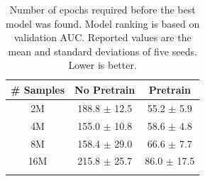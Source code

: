 \begin{table}[]
\centering
    \begin{tabular}{c|c|c}
    \hhline{===}
    \# Samples & No Pretrain & Pretrain \\ \hline
    2M  & 188.8 $\pm$ 12.5 & 55.2 $\pm$ 5.9 \\
    4M  & 155.0 $\pm$ 10.8 & 58.6 $\pm$ 4.8 \\
    8M  & 158.4 $\pm$ 29.0 & 66.6 $\pm$ 7.7 \\
    16M & 215.8 $\pm$ 25.7 & 86.0 $\pm$ 17.5 \\
    \hhline{===}
    \end{tabular}
    \caption{Number of epochs required before the best model was found. Model ranking is based on validation AUC. Reported values are the mean and standard deviations of five seeds. Lower is better.}
    \label{tab:num_epochs}
\end{table}

